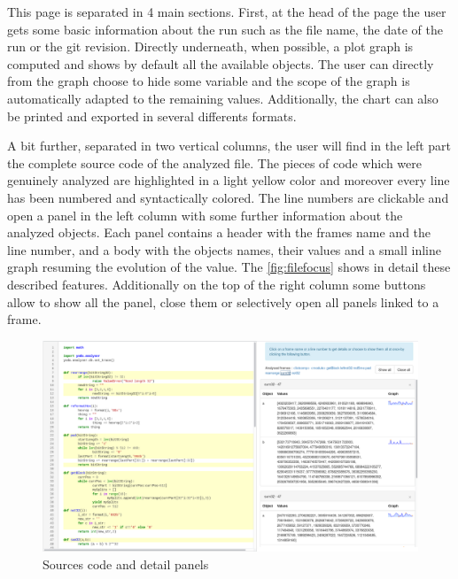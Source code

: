 This page is separated in 4 main sections. First, at the head of the page the user gets some basic information about the run such as the file name, the date of the run or the git revision. Directly underneath, when possible, a plot graph is computed and shows by default all the available objects. The user can directly from the graph choose to hide some variable and the scope of the graph is automatically adapted to the remaining values. Additionally, the chart can also be printed and exported in several differents formats.

A bit further, separated in two vertical columns, the user will find in the left part the complete source code of the analyzed file. The pieces of code which were genuinely analyzed are highlighted in a light yellow color and moreover every line has been numbered and syntactically colored. The line numbers are clickable and open a panel in the left column with some further information about the analyzed objects. Each panel contains a header with the frames name and the line number, and a body with the objects names, their values and a small inline graph resuming the evolution of the value. The \autoref{fig:filefocus} shows in detail these described features. Additionally on the top of the right column some buttons allow to show all the panel, close them or selectively open all panels linked to a frame.

\begin{figure}[h!]
  \centering
    \includegraphics[width=\textwidth]{figures/yoda-file-focus.png}
    \caption{Sources code and detail panels}
    \label{fig:filefocus}
\end{figure}

